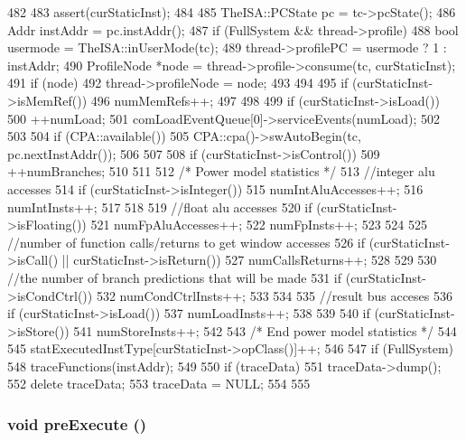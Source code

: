 \begin{DoxyCode}
482 {
483     assert(curStaticInst);
484 
485     TheISA::PCState pc = tc->pcState();
486     Addr instAddr = pc.instAddr();
487     if (FullSystem && thread->profile) {
488         bool usermode = TheISA::inUserMode(tc);
489         thread->profilePC = usermode ? 1 : instAddr;
490         ProfileNode *node = thread->profile->consume(tc, curStaticInst);
491         if (node)
492             thread->profileNode = node;
493     }
494 
495     if (curStaticInst->isMemRef()) {
496         numMemRefs++;
497     }
498 
499     if (curStaticInst->isLoad()) {
500         ++numLoad;
501         comLoadEventQueue[0]->serviceEvents(numLoad);
502     }
503 
504     if (CPA::available()) {
505         CPA::cpa()->swAutoBegin(tc, pc.nextInstAddr());
506     }
507 
508     if (curStaticInst->isControl()) {
509         ++numBranches;
510     }
511 
512     /* Power model statistics */
513     //integer alu accesses
514     if (curStaticInst->isInteger()){
515         numIntAluAccesses++;
516         numIntInsts++;
517     }
518 
519     //float alu accesses
520     if (curStaticInst->isFloating()){
521         numFpAluAccesses++;
522         numFpInsts++;
523     }
524     
525     //number of function calls/returns to get window accesses
526     if (curStaticInst->isCall() || curStaticInst->isReturn()){
527         numCallsReturns++;
528     }
529     
530     //the number of branch predictions that will be made
531     if (curStaticInst->isCondCtrl()){
532         numCondCtrlInsts++;
533     }
534     
535     //result bus acceses
536     if (curStaticInst->isLoad()){
537         numLoadInsts++;
538     }
539     
540     if (curStaticInst->isStore()){
541         numStoreInsts++;
542     }
543     /* End power model statistics */
544 
545     statExecutedInstType[curStaticInst->opClass()]++;
546 
547     if (FullSystem)
548         traceFunctions(instAddr);
549 
550     if (traceData) {
551         traceData->dump();
552         delete traceData;
553         traceData = NULL;
554     }
555 }
\end{DoxyCode}
\hypertarget{classBaseSimpleCPU_ad341f256f4b26b20980f548e42ea79c4}{
\subsubsection[{preExecute}]{\setlength{\rightskip}{0pt plus 5cm}void preExecute ()}}
\label{classBaseSimpleCPU_ad341f256f4b26b20980f548e42ea79c4}



